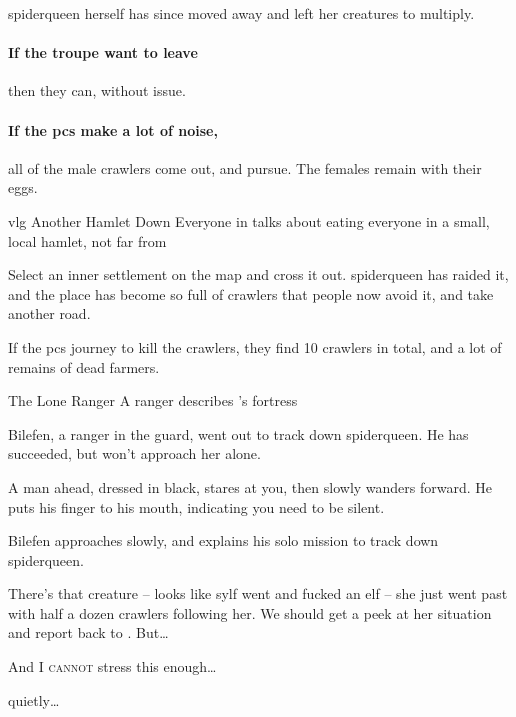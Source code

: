 
\Gls{spiderqueen} herself has since moved away and left her creatures to multiply.

\paragraph{If the troupe want to leave}
then they can, without issue.

\paragraph{If the \glspl{pc} make a lot of noise,}
all of the male \glspl{crawler} come out, and pursue.
The females remain with their eggs.

{\gls{vlg} Another Hamlet Down}%
{Everyone in  talks about  eating everyone in a small, local hamlet, not far from }%

Select an inner settlement on the map and cross it out.
\Gls{spiderqueen} has raided it, and the place has become so full of \glspl{crawler} that people now avoid it, and take another road.

If the \glspl{pc} journey to kill the \glspl{crawler}, they find 10 \glspl{crawler} in total, and a lot of remains of dead farmers.

{The Lone Ranger}%
{A  ranger describes 's fortress}%

Bilefen, a ranger in the \gls{guard}, went out to track down \gls{spiderqueen}.
He has succeeded, but won't approach her alone.

\begin{boxtext}
  A man ahead, dressed in black, stares at you, then slowly wanders forward.
  He puts his finger to his mouth, indicating you need to be silent.
\end{boxtext}

Bilefen approaches slowly, and explains his solo mission to track down \gls{spiderqueen}.

\begin{speechtext}
  \small
  There's that creature -- looks like \gls{sylf} went and fucked an elf -- she just went past with half a dozen \glspl{crawler} following her.
  We should get a peek at her situation and report back to .
  But\ldots

  And I {\large\scshape cannot} stress this enough\ldots

  \noindent
  quietly\ldots
\end{speechtext}

